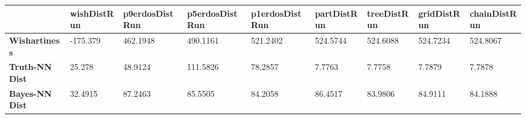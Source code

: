 \begin{tabular}{|l|l|l|l|l|l|l|l|l|}
\hline
&\textbf{wishDistRun}&\textbf{p9erdosDistRun}&\textbf{p5erdosDistRun}&\textbf{p1erdosDistRun}&\textbf{partDistRun}&\textbf{treeDistRun}&\textbf{gridDistRun}&\textbf{chainDistRun}\\\hline
\textbf{Wishartiness}&-175.379&462.1948&490.1161&521.2402&524.5744&524.6088&524.7234&524.8067\\\hline
\textbf{Truth-NN Dist}&25.278&48.9124&111.5826&78.2857&7.7763&7.7758&7.7879&7.7878\\\hline
\textbf{Bayes-NN Dist}&32.4915&87.2463&85.5505&84.2058&86.4517&83.9806&84.9111&84.1888\\\hline
\end{tabular}
